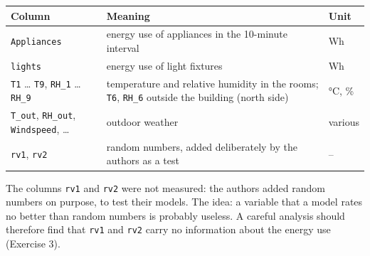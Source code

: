 \documentclass[
  letterpaper,
  DIV=11,
  numbers=noendperiod]{scrreprt}
\begin{document}
\begin{longtable}[]{@{}
  >{\raggedright\arraybackslash}p{}
  >{\raggedright\arraybackslash}p{}
  >{\raggedright\arraybackslash}p{}@{}}
\toprule\noalign{}
\begin{minipage}[b]{\linewidth}\raggedright
Column
\end{minipage} & \begin{minipage}[b]{\linewidth}\raggedright
Meaning
\end{minipage} & \begin{minipage}[b]{\linewidth}\raggedright
Unit
\end{minipage} \\
\midrule\noalign{}
\endhead
\bottomrule\noalign{}
\endlastfoot
\texttt{Appliances} & energy use of appliances in the 10-minute interval
& Wh \\
\texttt{lights} & energy use of light fixtures & Wh \\
\texttt{T1} \ldots{} \texttt{T9}, \texttt{RH\_1} \ldots{} \texttt{RH\_9}
& temperature and relative humidity in the rooms; \texttt{T6},
\texttt{RH\_6} outside the building (north side) & °C, \% \\
\texttt{T\_out}, \texttt{RH\_out}, \texttt{Windspeed}, \ldots{} &
outdoor weather & various \\
\texttt{rv1}, \texttt{rv2} & random numbers, added deliberately by the
authors as a test & -- \\
\end{longtable}

The columns \texttt{rv1} and \texttt{rv2} were not measured: the authors
added random numbers on purpose, to test their models. The idea: a
variable that a model rates no better than random numbers is probably
useless. A careful analysis should therefore find that \texttt{rv1} and
\texttt{rv2} carry no information about the energy use (Exercise 3).
\end{document}
